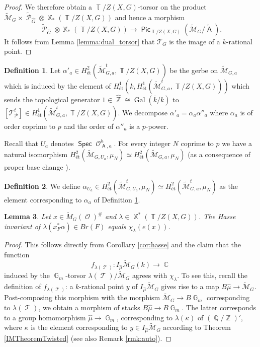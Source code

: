 \documentclass{article}
\DeclareMathOperator{\A}{\mathsf{A}}
\DeclareMathOperator{\Cb}{\mathbb{C}}
\DeclareMathOperator{\Zb}{\mathbb{Z}}
\DeclareMathOperator{\Xb}{\mathbb{X}}
\DeclareMathOperator{\Gal}{Gal}
\DeclareMathOperator{\G}{\mathbb{G}}
\DeclareMathOperator{\Tb}{\mathbb{T}}
\newcommand{\Mc}{\mathcal{M}}
\DeclareMathOperator{\Pc}{\mathcal{P}}
\DeclareMathOperator{\Spec}{\mathsf{Spec}}
\DeclareMathOperator{\Oo}{\mathcal{O}}
\DeclareMathOperator{\Tc}{\mathcal{T}}
\DeclareMathOperator{\Qb}{\mathbb{Q}}
\DeclareMathOperator{\Pic}{\mathsf{Pic}}
\theoremstyle{definition}
\newtheorem{definition}{Definition}[section]
\theoremstyle{plain}
\newtheorem{lemma}[definition]{Lemma}
\begin{document}
\begin{proof}
We therefore obtain a $\Tb/Z(X,G)$-torsor on the product $\widetilde{\Mc}_G \times \widetilde{\Pc}_{\widehat{G}} \otimes \Xb_*(\Tb/Z(X,G))$ and hence a morphism $$\widetilde{\Pc}_{\widehat{G}} \otimes {\Xb_*(\Tb/Z(X,G))} \to \Pic_{\Tb/Z(X,G)}(\widetilde{\Mc}_G/\widetilde{\A}).$$
It follows from Lemma \ref{lemma:dual_torsor} that $\mathcal{T}_G$ is the image of a $k$-rational point.
\end{proof}

\begin{definition}\label{defi:alpha'}
Let $\alpha'_a \in H^2_{\text{\'et}}(\widetilde{\mathcal{M}}^t_{G,{a}},\Tb/Z(X,G))$ be the gerbe on $\widetilde{\Mc}_{G,a}$ which is induced by the element of $H^1_{\text{\'et}}(k,H^1_{\text{\'et}}(\widetilde{\mathcal{M}}^t_{G,{a}},\Tb/Z(X,G)))$ which sends the topological generator $1 \in \widehat{\Zb}\cong \Gal(\bar k/k)$ to $[\mathcal{T}^t_{\Pc}] \in H^1_{\text{\'et}}(\widetilde{\mathcal{M}}^t_{G,{a}},\Tb/Z(X,G))$. We decompose $\alpha'_a = \alpha_a \alpha''_a$ where $\alpha_a$ is of order coprime to $p$ and the order of $\alpha''_a$ is a $p$-power.
\end{definition}

Recall that $U_a$ denotes $\Spec \Oo^h_{\A,a}$. For every integer $N$ coprime to $p$ we have a natural isomorphism $H^2_{\text{\'et}}(\widetilde{\Mc}_{G,U_a},\mu_N) \simeq H^2_{\text{\'et}}(\widetilde{\Mc}_{G,a},\mu_N)$ (as a consequence of proper base change \cite[Expos\'e XVI]{SGA43}).

\begin{definition}\label{defi:alpha}
We define $\alpha_{U_a} \in H^2_{\text{\'et}}(\widetilde{\Mc}^t_{G,U_a},\mu_N) \simeq H^2_{\text{\'et}}(\widetilde{\Mc}^t_{G,a},\mu_N)$  as the element corresponding to $\alpha_a$ of Definition \ref{defi:alpha'}.
\end{definition}

\begin{lemma}\label{lemma:chi_gerbe}
Let $x \in \widetilde{M}_G(\Oo)^{\#}$ and $\lambda \in \Xb^*(\Tb/Z(X,G))$. The Hasse invariant of $\lambda(x_F^*\alpha) \in Br(F)$ equals $\chi_{\lambda}(e(x))$. 
\end{lemma}

\begin{proof}
This follows directly from Corollary \ref{cor:hasse} and the claim that the function 
$$f_{\lambda(\Tc)}\colon I_{\widehat{\mu}}\widetilde{\Mc}_G(k) \to \Cb$$ 
induced by the $\G_m$-torsor $\lambda(\Tc)/\widetilde{\Mc}_G$ agrees with $\chi_{\lambda}$. To see this, recall the definition of $f_{\lambda(\Tc)}$: a $k$-rational point $y$ of $I_{\widehat{\mu}}\widetilde{\Mc}_G$ gives rise to a map $B\widehat{\mu} \to \widetilde{\Mc}_G$. Post-composing this morphism with the morphism $\widetilde{\Mc}_G \to B\G_m$ corresponding to $\lambda(\Tc)$, we obtain a morphism of stacks $B\widehat{\mu} \to B\G_m$. The latter corresponds to a group homomorphism $\widehat{\mu} \to \G_m$, corresponding to $\lambda(\kappa)$ of $(\Qb/\Zb)'$, where $\kappa$ is the element corresponding to $y \in I_{\widehat{\mu}}\widetilde{\Mc}_G$ according to Theorem \ref{IMTheoremTwisted} (see also Remark \ref{rmk:auto}).
\end{proof}
\end{document}
